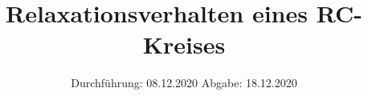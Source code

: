 

\subject{V353}
\title{Relaxationsverhalten eines RC-Kreises}
\date{%
  Durchführung: 08.12.2020
  \hspace{3em}
  Abgabe: 18.12.2020
}



\maketitle
\thispagestyle{empty}
\tableofcontents
\newpage






\printbibliography{}


